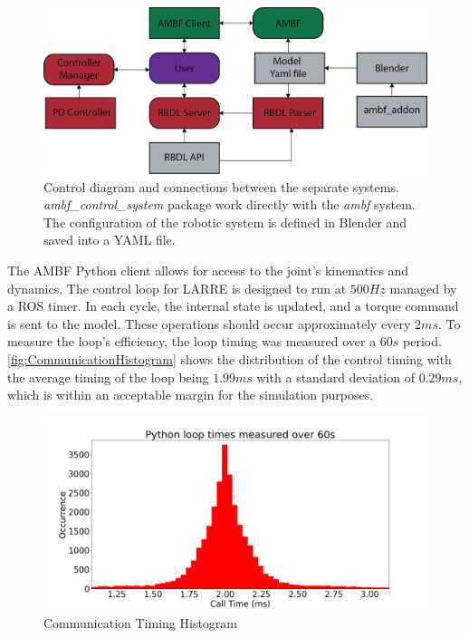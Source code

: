   \begin{figure}[h]
    \centering
    \includegraphics{images/sim/AMBF_control_diagram (1).png}
    \caption[AMBF Control Diagram]{Control diagram and connections between the separate systems. \textit{ambf\_control\_system} package work directly with the \textit{ambf} system. The configuration of the robotic system is defined in Blender and saved into a YAML file.}
    \label{fig:SystemDiagram}
\end{figure}

 
 The AMBF Python client allows for access to the joint's kinematics and dynamics. The control loop for LARRE is designed to run at $500Hz$ managed by a ROS timer. In each cycle, the internal state is updated, and a torque command is sent to the model. These operations should occur approximately every $2ms$. To measure the loop's efficiency, the loop timing was measured over a $60s$ period. \autoref{fig:CommunicationHistogram} shows the distribution of the control timing with the average timing of the loop being $1.99ms$ with a standard deviation of $0.29ms$, which is within an acceptable margin for the simulation purposes. 
 
  
 \begin{figure}
     \centering
     \includegraphics[scale=0.35]{images/sim/loop_timming.png}
     \caption[Communication Timing Histogram]{Communication Timing Histogram}
     \label{fig:CommunicationHistogram}
 \end{figure}
 
